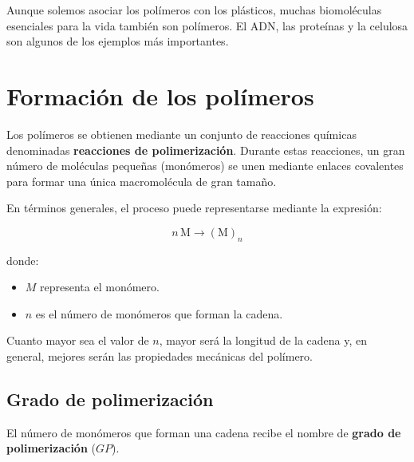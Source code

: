 
\begin{tcolorbox}[
title=Curiosidad,
colback=green!5,
colframe=green!50!black]

Aunque solemos asociar los polímeros con los plásticos, muchas biomoléculas esenciales para la vida también son polímeros. El ADN, las proteínas y la celulosa son algunos de los ejemplos más importantes.

\end{tcolorbox}

%


\section{Formación de los polímeros}

Los polímeros se obtienen mediante un conjunto de reacciones químicas denominadas
\textbf{reacciones de polimerización}. Durante estas reacciones, un gran número de
moléculas pequeñas (monómeros) se unen mediante enlaces covalentes para formar una
única macromolécula de gran tamaño.

En términos generales, el proceso puede representarse mediante la expresión:

\[
n\,\mathrm{M}\longrightarrow (\mathrm{M})_n
\]

donde:

\begin{itemize}
    \item \(M\) representa el monómero.
    \item \(n\) es el número de monómeros que forman la cadena.
\end{itemize}

Cuanto mayor sea el valor de \(n\), mayor será la longitud de la cadena y, en
general, mejores serán las propiedades mecánicas del polímero.


\subsection{Grado de polimerización}

El número de monómeros que forman una cadena recibe el nombre de
\textbf{grado de polimerización} (\(GP\)).

